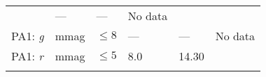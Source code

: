 \documentclass[DM,toc]{lsstdoc}
\begin{document}
\begin{longtable}[]{@{}llllll@{}}
\begin{minipage}[t]{0.17\columnwidth}
\end{minipage} & \begin{minipage}[t]{0.17\columnwidth}\raggedright\strut
---\strut
\end{minipage} & \begin{minipage}[t]{0.12\columnwidth}\raggedright\strut
---\strut
\end{minipage} & \begin{minipage}[t]{0.17\columnwidth}\raggedright\strut
No data\strut
\end{minipage}\tabularnewline
\begin{minipage}[t]{0.14\columnwidth}\raggedright\strut
PA1: \emph{g}\strut
\end{minipage} & \begin{minipage}[t]{0.06\columnwidth}\raggedright\strut
mmag\strut
\end{minipage} & \begin{minipage}[t]{0.17\columnwidth}\raggedright\strut
\(\leq 8\)\strut
\end{minipage} & \begin{minipage}[t]{0.17\columnwidth}\raggedright\strut
---\strut
\end{minipage} & \begin{minipage}[t]{0.12\columnwidth}\raggedright\strut
---\strut
\end{minipage} & \begin{minipage}[t]{0.17\columnwidth}\raggedright\strut
No data\strut
\end{minipage}\tabularnewline
\begin{minipage}[t]{0.14\columnwidth}\raggedright\strut
PA1: \emph{r}\strut
\end{minipage} & \begin{minipage}[t]{0.06\columnwidth}\raggedright\strut
mmag\strut
\end{minipage} & \begin{minipage}[t]{0.17\columnwidth}\raggedright\strut
\(\leq 5\)\strut
\end{minipage} & \begin{minipage}[t]{0.17\columnwidth}\raggedright\strut
8.0\strut
\end{minipage} & \begin{minipage}[t]{0.12\columnwidth}\raggedright\strut
14.30\strut
\end{minipage} & \begin{minipage}[t]{0.17\columnwidth}\raggedright\strut
\strut
\end{minipage}\tabularnewline
\begin{minipage}[t]{0.14\columnwidth}\raggedright\strut

\end{minipage}
\end{longtable}
\end{document}
